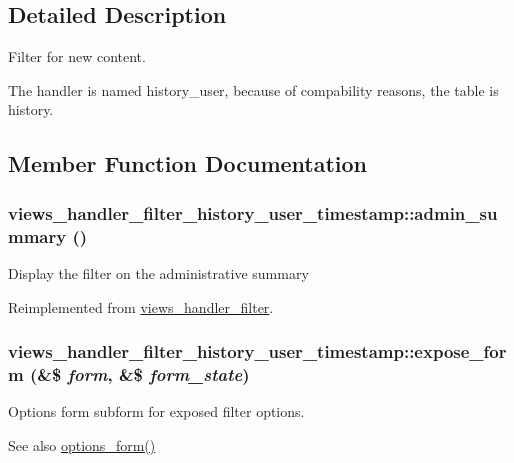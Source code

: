 \subsection{Detailed Description}
Filter for new content.

The handler is named history\_\-user, because of compability reasons, the table is history. 

\subsection{Member Function Documentation}
\hypertarget{classviews__handler__filter__history__user__timestamp_aa5eeead15fcc3d6e74ca62c31676e109}{
\subsubsection[{admin\_\-summary}]{\setlength{\rightskip}{0pt plus 5cm}views\_\-handler\_\-filter\_\-history\_\-user\_\-timestamp::admin\_\-summary ()}}
\label{classviews__handler__filter__history__user__timestamp_aa5eeead15fcc3d6e74ca62c31676e109}
Display the filter on the administrative summary 

Reimplemented from \hyperlink{classviews__handler__filter_a655263cd0b73188eec064b9a9743fe4c}{views\_\-handler\_\-filter}.\hypertarget{classviews__handler__filter__history__user__timestamp_a1977bbf7abbeaf89266ae9a7057c7cd7}{
\subsubsection[{expose\_\-form}]{\setlength{\rightskip}{0pt plus 5cm}views\_\-handler\_\-filter\_\-history\_\-user\_\-timestamp::expose\_\-form (\&\$ {\em form}, \/  \&\$ {\em form\_\-state})}}
\label{classviews__handler__filter__history__user__timestamp_a1977bbf7abbeaf89266ae9a7057c7cd7}
Options form subform for exposed filter options.

\begin{DoxySeeAlso}{See also}
\hyperlink{classviews__handler__filter_af14c69367162057a32709a6340de0988}{options\_\-form()} 
\end{DoxySeeAlso}


